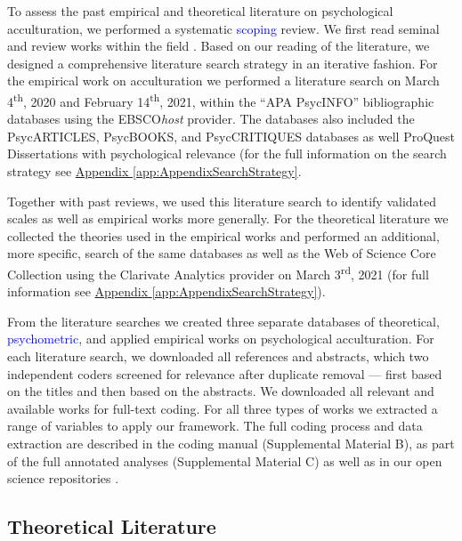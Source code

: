 \newcommand{\nTheo}{92}
\newcommand{\nMeth}{233}
\newcommand{\nEmp}{526}

To assess the past empirical and theoretical literature on psychological
acculturation, we performed a systematic \textcolor{blue}{scoping}
review. We first read seminal and review works within the field
\citep[including,][]{Ward2019, Berry1997b, Berry2003, Szapocznik1978, Sam2006a, Rudmin2003a}.
Based on our reading of the literature, we designed a comprehensive
literature search strategy in an iterative fashion. For the empirical
work on acculturation we performed a literature search on March
4\textsuperscript{th}, 2020 and February 14\textsuperscript{th}, 2021,
within the ``APA PsycINFO'' bibliographic databases using the
EBSCO\textit{host} provider. The databases also included the
PsycARTICLES, PsycBOOKS, and PsycCRITIQUES databases as well ProQuest
Dissertations with psychological relevance (for the full information on
the search strategy see
\hyperref[app:AppendixSearchStrategy]{Appendix \ref*{app:AppendixSearchStrategy}}.

Together with past reviews, we used this literature search to identify
validated scales as well as empirical works more generally. For the
theoretical literature we collected the theories used in the empirical
works and performed an additional, more specific, search of the same
databases as well as the Web of Science Core Collection using the
Clarivate Analytics provider on March 3\textsuperscript{rd}, 2021 (for
full information see
\hyperref[app:AppendixSearchStrategy]{Appendix \ref*{app:AppendixSearchStrategy}}).

From the literature searches we created three separate databases of
theoretical, \textcolor{blue}{psychometric}, and applied empirical works
on psychological acculturation. For each literature search, we
downloaded all references and abstracts, which two independent coders
screened for relevance after duplicate removal --- first based on the
titles and then based on the abstracts. We downloaded all relevant and
available works for full-text coding. For all three types of works we
extracted a range of variables to apply our framework. The full coding
process and data extraction are described in the coding manual
(Supplemental Material B), as part of the full annotated analyses
(Supplemental Material C) as well as in our open science repositories
\citep[see][]{Kreienkamp2021d, Kreienkamp2021e}.

\subsection{Theoretical Literature}

